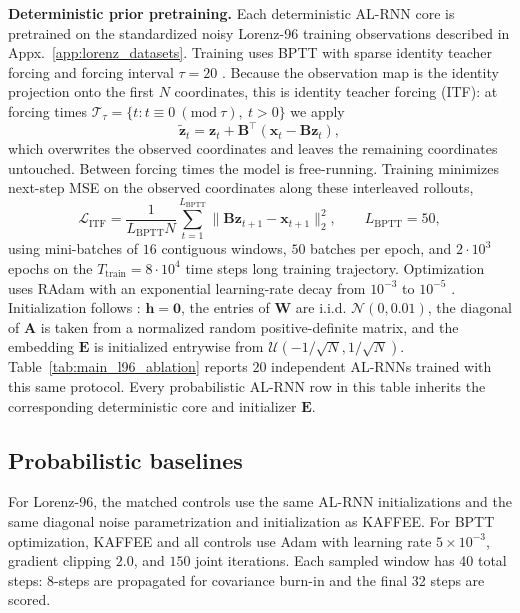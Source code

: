 \documentclass{article}
\theoremstyle{plain}
\theoremstyle{definition}
\theoremstyle{remark}
\begin{document}
\textbf{Deterministic prior pretraining.}
Each deterministic AL-RNN core is pretrained on the standardized noisy Lorenz-96 training observations described in Appx.~\ref{app:lorenz_datasets}. Training uses BPTT with sparse identity teacher forcing and forcing interval $\tau=20$ \citep{mikhaeil2022difficulty,brenner2024almostlinear}. Because the observation map is the identity projection onto the first $N$ coordinates, this is identity teacher forcing (ITF): at forcing times $\mathcal T_\tau=\{t:t\equiv 0\ (\mathrm{mod}\ \tau),\ t>0\}$ we apply
\[
\tilde{\bm z}_t
=
\bm z_t + \bm B^{\top}(\bm x_t-\bm B\bm z_t),
\]
which overwrites the observed coordinates and leaves the remaining coordinates untouched. Between forcing times the model is free-running. Training minimizes next-step MSE on the observed coordinates along these interleaved rollouts,
\[
\mathcal L_{\mathrm{ITF}}
=
\frac{1}{L_{\mathrm{BPTT}}N}
\sum_{t=1}^{L_{\mathrm{BPTT}}}
\lVert \bm B\bm z_{t+1}-\bm x_{t+1}\rVert_2^2,
\qquad
L_{\mathrm{BPTT}}=50,
\]
using mini-batches of $16$ contiguous windows, $50$ batches per epoch, and $2\cdot 10^3$ epochs on the $T_{\mathrm{train}}=8 \cdot 10^4$ time steps long training trajectory. Optimization uses RAdam with an exponential learning-rate decay from $10^{-3}$ to $10^{-5}$ \citep{liu2020variance}. Initialization follows \citep{brenner2024almostlinear}: $\bm h=\bm 0$, the entries of $\bm W$ are i.i.d. $\mathcal N(0,0.01)$, the diagonal of $\bm A$ is taken from a normalized random positive-definite matrix, and the embedding $\bm E$ is initialized entrywise from $\mathcal U(-1/\sqrt{N},1/\sqrt{N})$. Table~\ref{tab:main_l96_ablation} reports $20$ independent AL-RNNs trained with this same protocol. Every probabilistic AL-RNN row in this table inherits the corresponding deterministic core and initializer $\bm E$.

\subsection{Probabilistic baselines}
\label{app:alrnn_probabilistic_baselines}

For Lorenz-96, the matched controls use the same AL-RNN initializations and the same diagonal noise parametrization and initialization as KAFFEE. For BPTT optimization, KAFFEE and all controls use Adam with learning rate $5\times10^{-3}$, gradient clipping $2.0$, and $150$ joint iterations. Each sampled window has 40 total steps: 8-steps are propagated for covariance burn-in and the final 32 steps are scored. 
\end{document}
